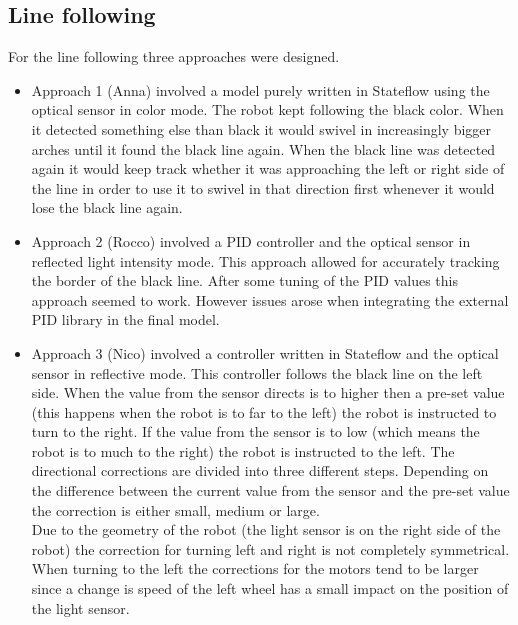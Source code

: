 \documentclass[a4paper,12pt]{article}
\begin{document}
\subsection{Line following}
For the line following three approaches were designed. 
\begin{itemize}
    \item Approach 1 (Anna) involved a model purely written in Stateflow using the optical sensor in color mode. The robot kept following the black color. When it detected something else than black it would swivel in increasingly bigger arches until it found the black line again. When the black line was detected again it would keep track whether it was approaching the left or right side of the line in order to use it to swivel in that direction first whenever it would lose the black line again.
    \item Approach 2 (Rocco) involved a PID controller and the optical sensor in reflected light intensity mode. This approach allowed for accurately tracking the border of the black line. After some tuning of the PID values this approach seemed to work. However issues arose when integrating the external PID library in the final model.
    \item Approach 3 (Nico) involved a controller written in Stateflow and the optical sensor in reflective mode. This controller follows the black line on the left side. When the value from the sensor directs is to higher then a pre-set value (this happens when the robot is to far to the left) the robot is instructed to turn to the right. If the value from the sensor is to low (which means the robot is to much to the right) the robot is instructed to the left. The directional corrections are divided into three different steps. Depending on the difference between the current value from the sensor and the pre-set value the correction is either small, medium or large.\\
    Due to the geometry of the robot (the light sensor is on the right side of the robot) the correction for turning left and right is not completely symmetrical. When turning to the left the corrections for the motors tend to be larger since a change is speed of the left wheel has a small impact on the position of the light sensor.
\end{itemize}



\end{document}
